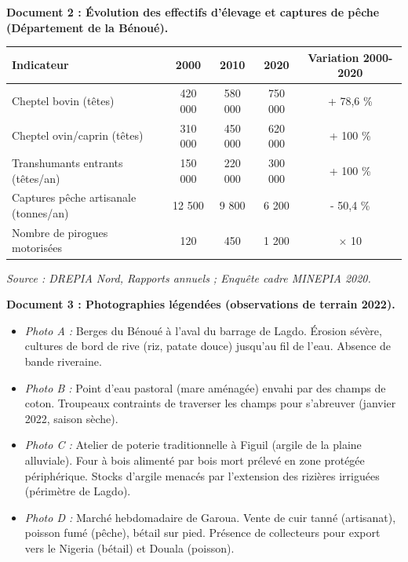 \documentclass[11pt]{article}
\begin{document}
\textbf{Document 2 : Évolution des effectifs d'élevage et captures de pêche (Département de la Bénoué).}
\begin{center}
\begin{tabular}{|l|cccc|}\hline
\textbf{Indicateur} & \textbf{2000} & \textbf{2010} & \textbf{2020} & \textbf{Variation 2000-2020} \\ \hline
Cheptel bovin (têtes) & 420 000 & 580 000 & 750 000 & + 78,6 \% \\
Cheptel ovin/caprin (têtes) & 310 000 & 450 000 & 620 000 & + 100 \% \\
Transhumants entrants (têtes/an) & 150 000 & 220 000 & 300 000 & + 100 \% \\
Captures pêche artisanale (tonnes/an) & 12 500 & 9 800 & 6 200 & - 50,4 \% \\
Nombre de pirogues motorisées & 120 & 450 & 1 200 & $\times$ 10 \\ \hline
\end{tabular}
\end{center}
\emph{Source : DREPIA Nord, Rapports annuels ; Enquête cadre MINEPIA 2020.}

\textbf{Document 3 : Photographies légendées (observations de terrain 2022).}
\begin{itemize}
    \item \textit{Photo A :} Berges du Bénoué à l'aval du barrage de Lagdo. Érosion sévère, cultures de bord de rive (riz, patate douce) jusqu'au fil de l'eau. Absence de bande riveraine.
    \item \textit{Photo B :} Point d'eau pastoral (mare aménagée) envahi par des champs de coton. Troupeaux contraints de traverser les champs pour s'abreuver (janvier 2022, saison sèche).
    \item \textit{Photo C :} Atelier de poterie traditionnelle à Figuil (argile de la plaine alluviale). Four à bois alimenté par bois mort prélevé en zone protégée périphérique. Stocks d'argile menacés par l'extension des rizières irriguées (périmètre de Lagdo).
    \item \textit{Photo D :} Marché hebdomadaire de Garoua. Vente de cuir tanné (artisanat), poisson fumé (pêche), bétail sur pied. Présence de collecteurs pour export vers le Nigeria (bétail) et Douala (poisson).
\end{itemize}
\end{document}
